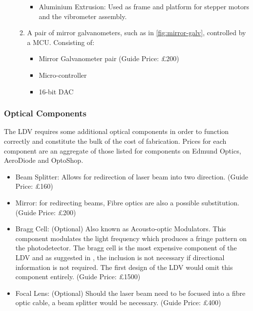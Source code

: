 \begin{itemize}
\begin{enumerate}
\begin{itemize}
        \item
          Aluminium Extrusion: Used as frame and platform for stepper motors and
          the vibrometer assembly.
        \end{itemize}
    \item
        A pair of mirror galvanometers, such as in \ref{fig:mirror-galv},
        controlled by a MCU. Consisting of: 
        \begin{itemize}
        \tightlist
        \item
            Mirror Galvanometer pair (Guide Price: £200)
        \item
            Micro-controller
        \item
            16-bit DAC
        \end{itemize}
    \end{enumerate}
  \end{itemize}

\hypertarget{optics}{%
\subsubsection{Optical Components}\label{optics}}

The LDV requires some additional optical components in order to function
correctly and constitute the bulk of the cost of fabrication. Prices for each
component are an aggregate of those listed for components on Edmund Optics,
AeroDiode and OptoShop.

\begin{itemize}
\tightlist
\item
  Beam Splitter: Allows for redirection of laser beam into two direction. (Guide
  Price: £160)
\item
  Mirror: for redirecting beams, Fibre optics are also a possible substitution.
  (Guide Price: £200)
\item
  Bragg Cell: (Optional) Also known as Acousto-optic Modulators. This component
  modulates the light frequency which produces a fringe pattern on the
  photodetector. The bragg cell is the most expensive component of the LDV and
  as suggested in \cite{MALAHS2015DESIGNOA}, the inclusion is not necessary if
  directional information is not required. The first design of the LDV would
  omit this component entirely. (Guide Price: £1500)
\item
  Focal Lens: (Optional) Should the laser beam need to be focused into a fibre
  optic cable, a beam splitter would be necessary. (Guide Price: £400)
\end{itemize}

